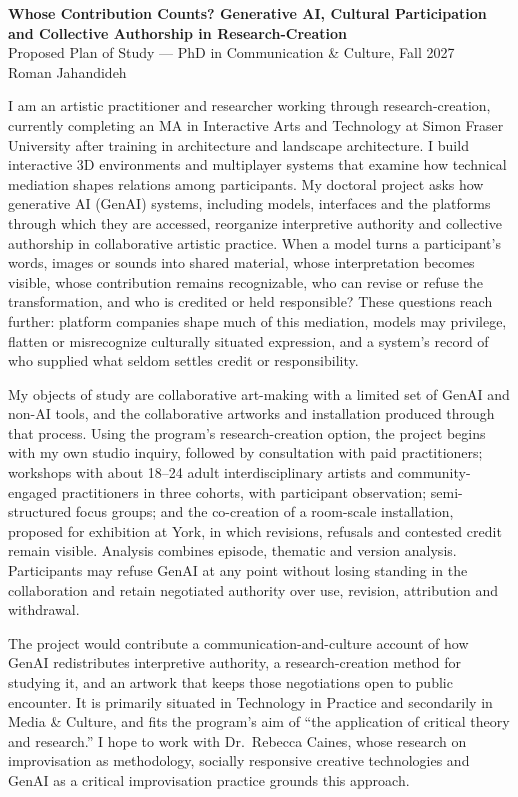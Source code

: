 \documentclass[letterpaper,11pt]{article}
\begin{document}
\begin{center}
  {\bf\large Whose Contribution Counts? Generative AI, Cultural Participation\\
  and Collective Authorship in Research-Creation}\\[2pt]
  {\small Proposed Plan of Study --- PhD in Communication \& Culture, Fall 2027\\
  Roman Jahandideh}
\end{center}

I am an artistic practitioner and researcher working through
research-creation, currently completing an MA in Interactive Arts and
Technology at Simon Fraser University after training in architecture and
landscape architecture. I build interactive 3D environments and multiplayer
systems that examine how technical mediation shapes relations among
participants. My doctoral
project asks how generative AI (GenAI) systems, including models, interfaces and the
platforms through which they are accessed, reorganize interpretive authority and
collective authorship in collaborative artistic practice. When a model turns
a participant's words, images or sounds into shared material, whose
interpretation becomes visible, whose contribution remains recognizable, who
can revise or refuse the transformation, and who is credited or held
responsible? These questions reach further: platform companies
shape much of this mediation, models may privilege, flatten or misrecognize
culturally situated expression, and a system's record of who supplied what
seldom settles credit or responsibility.

My objects of study are collaborative art-making with a limited set of GenAI
and non-AI tools, and the collaborative artworks and installation produced
through that process. Using the program's
research-creation option, the project begins with my own studio inquiry,
followed by consultation with paid practitioners; workshops with
about 18--24 adult interdisciplinary artists and community-engaged
practitioners in three cohorts, with participant observation;
semi-structured focus groups; and the co-creation of a room-scale
installation, proposed for exhibition at York, in which revisions, refusals
and contested credit remain visible. Analysis combines episode, thematic and
version analysis.
Participants may refuse GenAI at any point without losing standing in the
collaboration and retain negotiated authority over use, revision,
attribution and withdrawal.

The project would contribute a communication-and-culture account of how
GenAI redistributes interpretive authority, a research-creation method for
studying it, and an artwork that keeps those negotiations open to public
encounter. It is primarily situated in Technology in Practice and secondarily in
Media \& Culture, and fits the program's aim of ``the application of critical
theory and research.'' I hope to work with Dr.\ Rebecca Caines, whose
research on improvisation as methodology, socially responsive creative
technologies and GenAI as a critical improvisation practice grounds this
approach.
\end{document}

